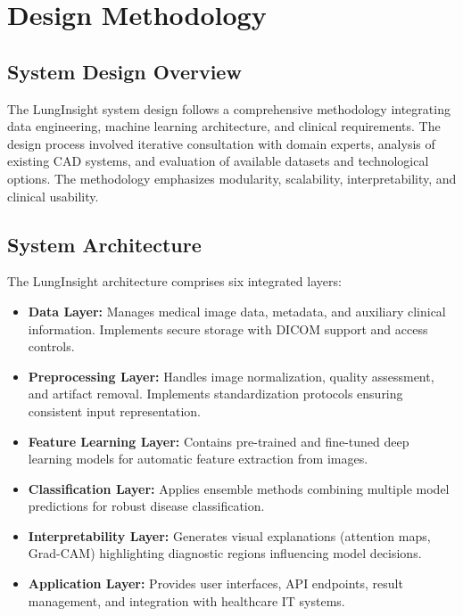 \chapter{Design Methodology}\thispagestyle{empty}
\graphicspath{{Chapter3/figures/}}
{

\section{System Design Overview}

The LungInsight system design follows a comprehensive methodology integrating data engineering, machine learning architecture, and clinical requirements. The design process involved iterative consultation with domain experts, analysis of existing CAD systems, and evaluation of available datasets and technological options. The methodology emphasizes modularity, scalability, interpretability, and clinical usability.

\section{System Architecture}

The LungInsight architecture comprises six integrated layers:

\begin{itemize}
    \item \textbf{Data Layer:} Manages medical image data, metadata, and auxiliary clinical information. Implements secure storage with DICOM support and access controls.
    \item \textbf{Preprocessing Layer:} Handles image normalization, quality assessment, and artifact removal. Implements standardization protocols ensuring consistent input representation.
    \item \textbf{Feature Learning Layer:} Contains pre-trained and fine-tuned deep learning models for automatic feature extraction from images.
    \item \textbf{Classification Layer:} Applies ensemble methods combining multiple model predictions for robust disease classification.
    \item \textbf{Interpretability Layer:} Generates visual explanations (attention maps, Grad-CAM) highlighting diagnostic regions influencing model decisions.
    \item \textbf{Application Layer:} Provides user interfaces, API endpoints, result management, and integration with healthcare IT systems.
\end{itemize}

}
